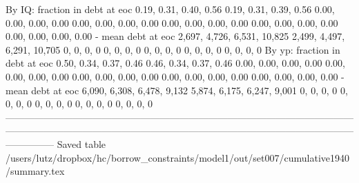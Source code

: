         By IQ: fraction in debt at eoc       0.19, 0.31, 0.40, 0.56       0.19, 0.31, 0.39, 0.56   0.00, 0.00, 0.00, 0.00    0.00, 0.00, 0.00, 0.00      0.00, 0.00, 0.00, 0.00      0.00, 0.00, 0.00, 0.00      0.00, 0.00, 0.00, 0.00
                    - mean debt at eoc  2,697, 4,726, 6,531, 10,825  2,499, 4,497, 6,291, 10,705               0, 0, 0, 0                0, 0, 0, 0                  0, 0, 0, 0                  0, 0, 0, 0                  0, 0, 0, 0
        By yp: fraction in debt at eoc       0.50, 0.34, 0.37, 0.46       0.46, 0.34, 0.37, 0.46   0.00, 0.00, 0.00, 0.00    0.00, 0.00, 0.00, 0.00      0.00, 0.00, 0.00, 0.00      0.00, 0.00, 0.00, 0.00      0.00, 0.00, 0.00, 0.00
                    - mean debt at eoc   6,090, 6,308, 6,478, 9,132   5,874, 6,175, 6,247, 9,001               0, 0, 0, 0                0, 0, 0, 0                  0, 0, 0, 0                  0, 0, 0, 0                  0, 0, 0, 0
---------------------------------------------------------------------------------------------------------------------------------------------------------------------------------------------------------------------------------------
Saved table  /users/lutz/dropbox/hc/borrow_constraints/model1/out/set007/cumulative1940/summary.tex 
